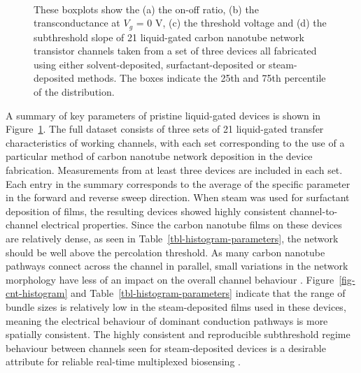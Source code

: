 \documentclass[
  a4paper,
]{scrbook}
\begin{document}
\begin{figure}
\begin{minipage}[t]{0.45\linewidth}
{{}

}

\end{minipage}%
%
\begin{minipage}[t]{0.01\linewidth}

{\centering 

~

}

\end{minipage}%

\caption[Boxplots showing the statistical distribution of the on-off
ratio, transconductance, threshold voltage and subthreshold slope of
liquid-gated encapsulated carbon nanotube network transistor channels
with thin-films deposited using various
methods.]{\label{fig-sweep-parameters}These boxplots show the (a) the
on-off ratio, (b) the transconductance at \(V_g\) = 0 V, (c) the
threshold voltage and (d) the subthreshold slope of 21 liquid-gated
carbon nanotube network transistor channels taken from a set of three
devices all fabricated using either solvent-deposited,
surfactant-deposited or steam-deposited methods. The boxes indicate the
25th and 75th percentile of the distribution.}

\end{figure}

A summary of key parameters of pristine liquid-gated devices is shown in
Figure~\ref{fig-sweep-parameters}. The full dataset consists of three
sets of 21 liquid-gated transfer characteristics of working channels,
with each set corresponding to the use of a particular method of carbon
nanotube network deposition in the device fabrication. Measurements from
at least three devices are included in each set. Each entry in the
summary corresponds to the average of the specific parameter in the
forward and reverse sweep direction. When steam was used for surfactant
deposition of films, the resulting devices showed highly consistent
channel-to-channel electrical properties. Since the carbon nanotube
films on these devices are relatively dense, as seen in
Table~\ref{tbl-histogram-parameters}, the network should be well above
the percolation threshold. As many carbon nanotube pathways connect
across the channel in parallel, small variations in the network
morphology have less of an impact on the overall channel behaviour
\autocite{Murugathas2018}. Figure~\ref{fig-cnt-histogram} and
Table~\ref{tbl-histogram-parameters} indicate that the range of bundle
sizes is relatively low in the steam-deposited films used in these
devices, meaning the electrical behaviour of dominant conduction
pathways is more spatially consistent. The highly consistent and
reproducible subthreshold regime behaviour between channels seen for
steam-deposited devices is a desirable attribute for reliable real-time
multiplexed biosensing \autocite{Kauffman2008,Heller2009,Gao2010}.
\end{document}
